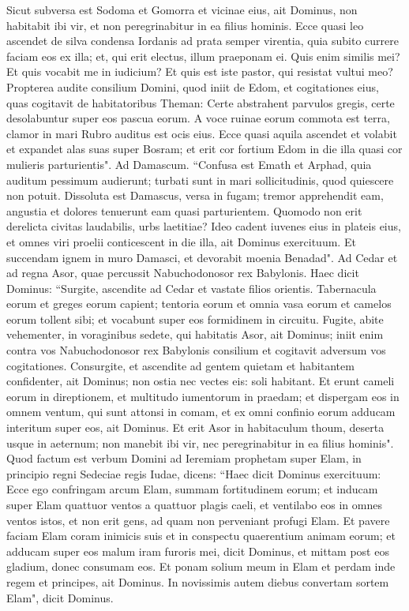 \begin{biblechapter}
\verse Sicut subversa est Sodoma et Gomorra et vicinae eius, ait Dominus, non habitabit ibi vir, et non peregrinabitur in ea filius hominis. 
\verse Ecce quasi leo ascendet de silva condensa Iordanis ad prata semper virentia, quia subito currere faciam eos ex illa; et, qui erit electus, illum praeponam ei. Quis enim similis mei? Et quis vocabit me in iudicium? Et quis est iste pastor, qui resistat vultui meo? 
\verse Propterea audite consilium Domini, quod iniit de Edom, et cogitationes eius, quas cogitavit de habitatoribus Theman: Certe abstrahent parvulos gregis, certe desolabuntur super eos pascua eorum. 
\verse A voce ruinae eorum commota est terra, clamor in mari Rubro auditus est ocis eius. 
\verse Ecce quasi aquila ascendet et volabit et expandet alas suas super Bosram; et erit cor fortium Edom in die illa quasi cor mulieris parturientis". 
\verse Ad Damascum. “Confusa est Emath et Arphad, quia auditum pessimum audierunt; turbati sunt in mari sollicitudinis, quod quiescere non potuit. 
\verse Dissoluta est Damascus, versa in fugam; tremor apprehendit eam, angustia et dolores tenuerunt eam quasi parturientem. 
\verse Quomodo non erit derelicta civitas laudabilis, urbs laetitiae? 
\verse Ideo cadent iuvenes eius in plateis eius, et omnes viri proelii conticescent in die illa, ait Dominus exercituum. 
\verse Et succendam ignem in muro Damasci, et devorabit moenia Benadad". 
\verse Ad Cedar et ad regna Asor, quae percussit Nabuchodonosor rex Babylonis. Haec dicit Dominus: “Surgite, ascendite ad Cedar et vastate filios orientis. 
\verse Tabernacula eorum et greges eorum capient; tentoria eorum et omnia vasa eorum et camelos eorum tollent sibi; et vocabunt super eos formidinem in circuitu. 
\verse Fugite, abite vehementer, in voraginibus sedete, qui habitatis Asor, ait Dominus; iniit enim contra vos Nabuchodonosor rex Babylonis consilium et cogitavit adversum vos cogitationes. 
\verse Consurgite, et ascendite ad gentem quietam et habitantem confidenter, ait Dominus; non ostia nec vectes eis: soli habitant. 
\verse Et erunt cameli eorum in direptionem, et multitudo iumentorum in praedam; et dispergam eos in omnem ventum, qui sunt attonsi in comam, et ex omni confinio eorum adducam interitum super eos, ait Dominus. 
\verse Et erit Asor in habitaculum thoum, deserta usque in aeternum; non manebit ibi vir, nec peregrinabitur in ea filius hominis". 
\verse Quod factum est verbum Domini ad Ieremiam prophetam super Elam, in principio regni Sedeciae regis Iudae, dicens: 
\verse “Haec dicit Dominus exercituum: Ecce ego confringam arcum Elam, summam fortitudinem eorum; 
\verse et inducam super Elam quattuor ventos a quattuor plagis caeli, et ventilabo eos in omnes ventos istos, et non erit gens, ad quam non perveniant profugi Elam. 
\verse Et pavere faciam Elam coram inimicis suis et in conspectu quaerentium animam eorum; et adducam super eos malum iram furoris mei, dicit Dominus, et mittam post eos gladium, donec consumam eos. 
\verse Et ponam solium meum in Elam et perdam inde regem et principes, ait Dominus. 
\verse In novissimis autem diebus convertam sortem Elam", dicit Dominus. 
\end{biblechapter}

